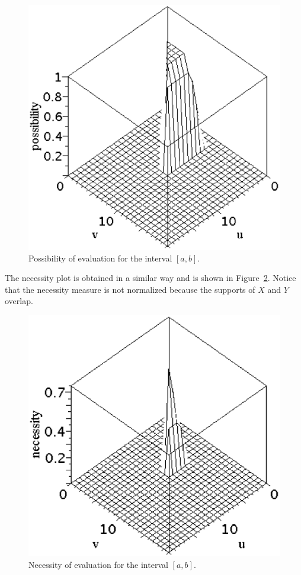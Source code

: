 \begin{figure}[h!]
\centering
\includegraphics[scale=0.4]{graphs/3D_possibility.eps}
\caption{Possibility of evaluation for the interval $[a,b]$.}
\label{fig:3d-possibility}
\end{figure}
The necessity plot is obtained in a similar way and is shown in Figure~\ref{fig:3d-necessity}. Notice that the necessity measure is not normalized because the supports of $X$ and $Y$ overlap.
\begin{figure}[h!]
\centering
\includegraphics[scale=0.4]{graphs/3D_necessity.eps}
\caption{Necessity of evaluation for the interval $[a,b]$.}
\label{fig:3d-necessity}
\end{figure}



